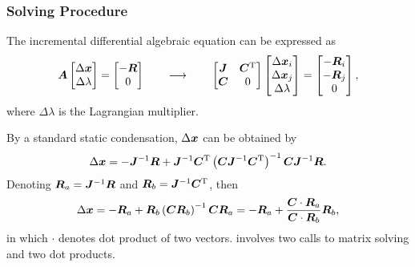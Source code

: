 \subsubsection{Solving Procedure}
The incremental differential algebraic equation can be expressed as
\begin{gather}
\bm{A}\begin{bmatrix}
\Delta\bm{x}\\\Delta\lambda
\end{bmatrix}=\begin{bmatrix}
-\bm{R}\\0
\end{bmatrix}\qquad\longrightarrow\qquad
\begin{bmatrix}
\bm{J}&\bm{C}^{\mathrm{T}}\\
\bm{C}&0
\end{bmatrix}\begin{bmatrix}
\Delta\bm{x}_i\\\Delta\bm{x}_j\\\Delta\lambda
\end{bmatrix}=\begin{bmatrix}
-\bm{R}_i\\-\bm{R}_j\\0
\end{bmatrix},
\end{gather}
where $\Delta\lambda$ is the Lagrangian multiplier.

By a standard static condensation, $\Delta\bm{x}$ can be obtained by
\begin{gather}
\Delta\bm{x}=-\bm{J}^{-1}\bm{R}+\bm{J}^{-1}\bm{C}^{\mathrm{T}}\left(\bm{C}\bm{J}^{-1}\bm{C}^{\mathrm{T}}\right)^{-1}\bm{C}\bm{J}^{-1}\bm{R}.
\end{gather}
Denoting $\bm{R}_a=\bm{J}^{-1}\bm{R}$ and $\bm{R}_b=\bm{J}^{-1}\bm{C}^{\mathrm{T}}$, then
\begin{gather}\label{nm:local_solving}
\Delta\bm{x}=-\bm{R}_a+\bm{R}_b\left(\bm{C}\bm{R}_b\right)^{-1}\bm{C}\bm{R}_a=-\bm{R}_a+\dfrac{\bm{C}\cdot\bm{R}_a}{\bm{C}\cdot\bm{R}_b}\bm{R}_b,
\end{gather}
in which $\cdot$ denotes dot product of two vectors.  involves two calls to matrix solving and two dot products.
